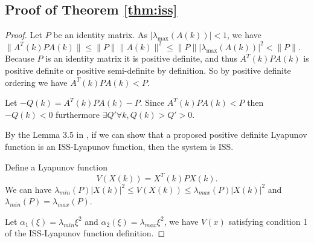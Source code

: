 \documentclass{sig-alternate}
\begin{document}
\subsection{Proof of Theorem \ref{thm:iss}}
\label{sec:thm:iss:proof}
		
\begin{proof}
Let $ P $ be an identity matrix.
As $ | \lambda_{\max} ( A(k) ) | < 1 $, we have
$ \lVert A^{T}(k) P A(k) \rVert \leq \lVert P \rVert \lVert A(k) \rVert^{2} \leq \lVert P \rVert | \lambda_{\max} ( A(k) ) |^{2} < \lVert P \rVert $.
Because $ P $ is an identity matrix it is positive definite, and thus $ A^{T}(k) P A(k) $ is positive definite or positive semi-definite by definition.
So by positive definite ordering we have $ A^{T}(k) P A(k) < P $.
		
Let $ -Q(k) = A^{T}(k) P A(k) - P $. Since $ A^{T}(k) P A(k) < P $ then $ - Q(k) < 0 $ furthermore $ \exists Q' \forall k, Q(k) > Q' > 0 $. 
		
By the Lemma 3.5 in \cite{Jiang2001857}, if we can show that a proposed positive definite Lyapunov function is an ISS-Lyapunov function, then the system is ISS.
		
Define a Lyapunov function
\begin{equation}
\label{eq:lyapunov_v}
V( X(k) ) = X^{T} (k) P X(k).
\end{equation}
We can have
$
\lambda_{min}(P) | X(k) |^{2} \leq V( X(k) )\leq \lambda_{max}(P) | X(k) |^{2}
$ and $ \lambda_{min}(P) = \lambda_{max}(P) $.
		
Let $ \alpha_{1} ( \xi )= \lambda_{min} \xi^{2} $
and 
$ \alpha_{2} ( \xi )= \lambda_{max} \xi^{2} $,
we have $ V(x) $ satisfying condition 1 of the ISS-Lyapunov function definition.
		

\end{proof}
\end{document}

